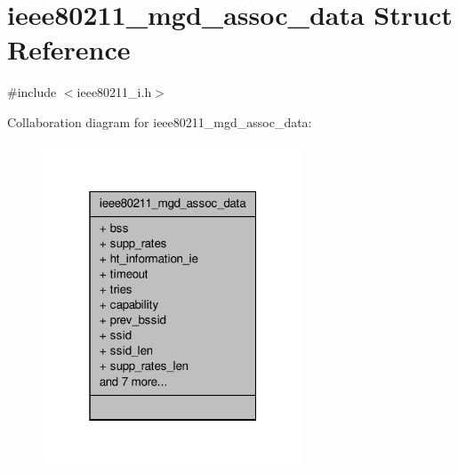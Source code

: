 \hypertarget{structieee80211__mgd__assoc__data}{\section{ieee80211\-\_\-mgd\-\_\-assoc\-\_\-data Struct Reference}
\label{structieee80211__mgd__assoc__data}
}


{\ttfamily \#include $<$ieee80211\-\_\-i.\-h$>$}



Collaboration diagram for ieee80211\-\_\-mgd\-\_\-assoc\-\_\-data\-:
\nopagebreak
\begin{figure}[H]
\begin{center}
\leavevmode
\includegraphics[width=220pt]{structieee80211__mgd__assoc__data__coll__graph}
\end{center}
\end{figure}
